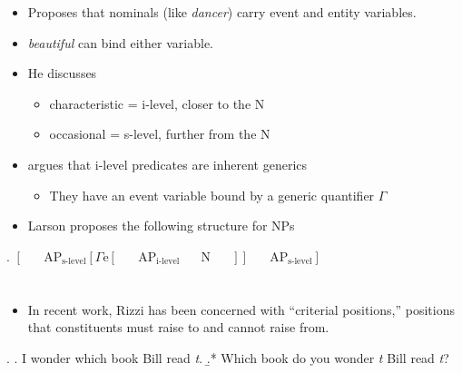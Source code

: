 \documentclass[letterpaper]{article}
\begin{document}
\begin{itemize}
  \item Proposes that nominals (like \textit{dancer}) carry event and entity variables.
  \item \textit{beautiful} can bind either variable.
  \item He discusses \textcite{bolinger1967adjectives}
    \begin{itemize}
      \item characteristic = i-level, closer to the N
      \item occasional = s-level, further from the N
    \end{itemize}
  \item \textcite{chierchia1995individual} argues that i-level predicates are inherent generics
    \begin{itemize}
      \item They have an event variable bound by a generic quantifier $\Gamma$
    \end{itemize}
  \item  Larson proposes the following structure for NPs
\end{itemize}
\ex. $\left[ \text{ ~~~~AP}_\text{s-level} \left[ \Gamma\text{e} \left[ \text{ ~~~~AP}_\text{i-level} \text{ ~~~~N ~~~~} \right] \right] \text{ ~~~~AP}_\text{s-level}  \right]$

\section{\textcite{rizzi2015notes}}
\begin{itemize}
  \item In recent work, Rizzi has been concerned with ``criterial positions,'' positions that constituents must raise to and cannot raise from.
\end{itemize}
\ex.
\a. I wonder which book Bill read \textit{t}.
\b.* Which book do you wonder \textit{t} Bill read \textit{t}?
\end{document}
